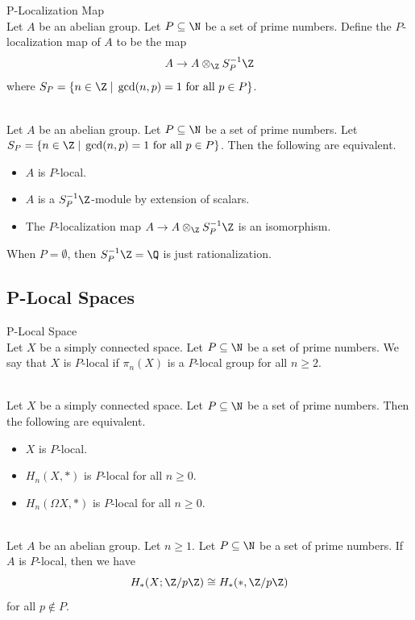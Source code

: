 \documentclass[a4paper]{article}
\begin{document}
\begin{defn}{P-Localization Map}{}\\
Let $A$ be an abelian group. Let $P\subseteq\N$ be a set of prime numbers. Define the $P$-localization map of $A$ to be the map $$A\to A\otimes_\Z S_P^{-1}\Z$$ where $S_P=\{n\in\Z\;|\;\gcd(n,p)=1\text{ for all }p\in P\}$.
\end{defn}

\begin{prp}{}{}\\
Let $A$ be an abelian group. Let $P\subseteq\N$ be a set of prime numbers. Let $S_P=\{n\in\Z\;|\;\gcd(n,p)=1\text{ for all }p\in P\}$. Then the following are equivalent. 
\begin{itemize}
\item $A$ is $P$-local. 
\item $A$ is a $S_P^{-1}\Z$-module by extension of scalars. 
\item The $P$-localization map $A\to A\otimes_\Z S_P^{-1}\Z$ is an isomorphism. 
\end{itemize}
\end{prp}

When $P=\emptyset$, then $S_P^{-1}\Z=\Q$ is just rationalization. 

\subsection{P-Local Spaces}
\begin{defn}{P-Local Space}{}\\
Let $X$ be a simply connected space. Let $P\subseteq\N$ be a set of prime numbers. We say that $X$ is $P$-local if $\pi_n(X)$ is a $P$-local group for all $n\geq 2$. 
\end{defn}

\begin{prp}{}{}\\
Let $X$ be a simply connected space. Let $P\subseteq\N$ be a set of prime numbers. Then the following are equivalent. 
\begin{itemize}
\item $X$ is $P$-local. 
\item $H_n(X,\ast)$ is $P$-local for all $n\geq 0$. 
\item $H_n(\Omega X,\ast)$ is $P$-local for all $n\geq 0$. 
\end{itemize}
\end{prp}

\begin{lmm}{}{}\\
Let $A$ be an abelian group. Let $n\geq 1$. Let $P\subseteq\N$ be a set of prime numbers. If $A$ is $P$-local, then we have $$H_\ast(X;\Z/p\Z)\cong H_\ast(\ast,\Z/p\Z)$$ for all $p\notin P$. 
\end{lmm}
\end{document}

